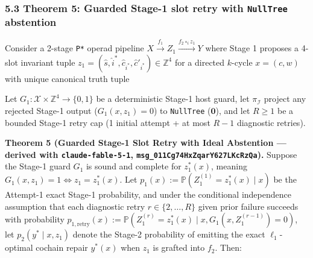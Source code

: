 \documentclass[
  11pt,
]{article}
\newcommand{\passthrough}[1]{#1}
\newcommand{\PfpDisplayMath}[1]{%
  \sbox{\PfpMathBox}{$\displaystyle #1$}%
  \ifdim\wd\PfpMathBox>\linewidth
    \resizebox{\linewidth}{!}{\usebox{\PfpMathBox}}%
  \else\usebox{\PfpMathBox}\fi}
\begin{document}
\subsubsection{\texorpdfstring{5.3 Theorem 5: Guarded Stage-1 slot retry
with \texttt{NullTree}
abstention}{5.3 Theorem 5: Guarded Stage-1 slot retry with NullTree abstention}}\label{theorem-5-guarded-stage-1-slot-retry-with-nulltree-abstention}

Consider a 2-stage \passthrough{\lstinline!P*!} operad pipeline
\(X \xrightarrow{f_1} Z_1 \xrightarrow{f_2 \circ_i z_1} Y\) where Stage
1 proposes a 4-slot invariant tuple
\(z_1 = (\hat{s},\allowbreak  \hat{i}^*,\allowbreak  \hat{c}_{i^*},\allowbreak  \hat{c}'_{i^*}) \in \mathbb{Z}^4\)
for a directed \(k\)-cycle \(x = (c,\allowbreak  w)\) with unique
canonical truth tuple
\begin{center}\PfpDisplayMath{z_1^*(x) = \left(s(c),\; i^*(w),\; c_{i^*},\; c_{i^*} - s(c)\right), \qquad i^*(w) := \min \arg\min_{0 \le j < k} w_j.}\end{center}
Let \(G_1: \mathcal{X} \times \mathbb{Z}^4 \to \{0,\allowbreak  1\}\) be
a deterministic Stage-1 host guard, let \(\pi_{\mathcal{I}}\) project
any rejected Stage-1 output (\(G_1(x,\allowbreak  z_1) = 0\)) to
\passthrough{\lstinline!NullTree!} (\(\mathbf{0}\)), and let \(R \ge 1\)
be a bounded Stage-1 retry cap (1 initial attempt + at most \(R - 1\)
diagnostic retries).

\textbf{Theorem 5 (Guarded Stage-1 Slot Retry with Ideal Abstention ---
derived with \nolinkurl{claude-fable-5-1},
\nolinkurl{msg_011Cg74HxZqarY627LKcRzQa}).} Suppose the Stage-1 guard
\(G_1\) is sound and complete for \(z_1^*(x)\), meaning
\(G_1(x,\allowbreak  z_1) = 1 \iff z_1 = z_1^*(x)\). Let
\(p_1(x) := \mathbb{P}(Z_1^{(1)} = z_1^*(x) \mid x)\) be the Attempt-1
exact Stage-1 probability, and under the conditional independence
assumption that each diagnostic retry
\(r \in \{2,\allowbreak  \dots,\allowbreak  R\}\) given prior failure
succeeds with probability
\(p_{1,\allowbreak \text{retry}}(x) := \mathbb{P}(Z_1^{(r)} = z_1^*(x) \mid x,\allowbreak  G_1(x,\allowbreak  Z_1^{(r-1)}) = 0)\),
let \(p_2(y^* \mid x,\allowbreak  z_1)\) denote the Stage-2 probability
of emitting the exact \(\ell_1\)-optimal cochain repair \(y^*(x)\) when
\(z_1\) is grafted into \(f_2\). Then:
\end{document}
